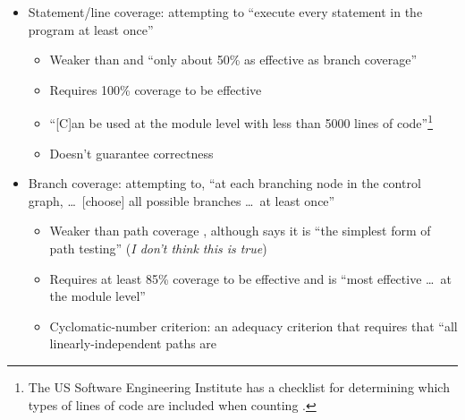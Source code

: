 \begin{itemize}
    \item Statement/line coverage: attempting to ``execute every statement in
          the program at least once'' \citep[p.~119]{Patton2006}
          \begin{itemize}
              \item Weaker than \citep[p.~421]{vanVliet2000} and
                    ``only about 50\% as effective as branch coverage''
                    \citep[p.~481]{PetersAndPedrycz2000}
              \item Requires 100\% coverage to be effective
                    \citep[p.~481]{PetersAndPedrycz2000}
              \item ``[C]an be used at the module level with less than 5000
                    lines of code''\footnote{The US Software Engineering
                        Institute has a checklist for determining which
                        types of lines of code are included when counting
                        \citep[pp.~30-31]{FentonAndPfleeger1997}.
                    } \citep[p.~481]{PetersAndPedrycz2000}
              \item Doesn't guarantee correctness
                    \citep[p.~421]{vanVliet2000}
          \end{itemize}
    \item Branch coverage: attempting to, ``at each branching node in the
          control graph, \dots\ [choose] all possible branches \dots\ at least
          once'' \citep[p.~421]{vanVliet2000}
          \begin{itemize}
              \item Weaker than path coverage
                    \citep[p.~433]{vanVliet2000}, although
                    \citep[p.~119]{Patton2006} says it is
                    ``the simplest form of path testing''
                    (\emph{I don't think this is true})
              \item Requires at least 85\% coverage to be effective and is
                    ``most effective \dots\ at the module level''
                    \citep[p.~481]{PetersAndPedrycz2000}
              \item Cyclomatic-number criterion: an adequacy criterion that
                    requires that ``all linearly-independent paths are

\end{itemize}
\end{itemize}
